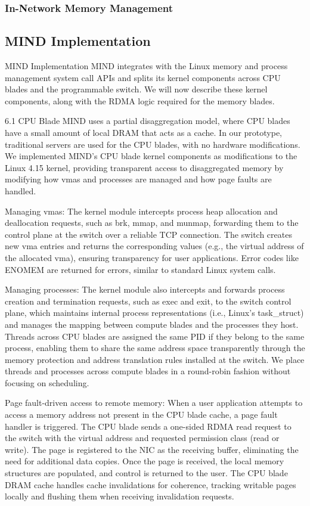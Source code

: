 \subsubsection{In-Network Memory Management}

\subsection{MIND Implementation}
MIND Implementation
MIND integrates with the Linux memory and process management system call APIs and splits its kernel components across CPU blades and the programmable switch. We will now describe these kernel components, along with the RDMA logic required for the memory blades.

6.1 CPU Blade
MIND uses a partial disaggregation model, where CPU blades have a small amount of local DRAM that acts as a cache. In our prototype, traditional servers are used for the CPU blades, with no hardware modifications. We implemented MIND’s CPU blade kernel components as modifications to the Linux 4.15 kernel, providing transparent access to disaggregated memory by modifying how vmas and processes are managed and how page faults are handled.

Managing vmas: The kernel module intercepts process heap allocation and deallocation requests, such as brk, mmap, and munmap, forwarding them to the control plane at the switch over a reliable TCP connection. The switch creates new vma entries and returns the corresponding values (e.g., the virtual address of the allocated vma), ensuring transparency for user applications. Error codes like ENOMEM are returned for errors, similar to standard Linux system calls.

Managing processes: The kernel module also intercepts and forwards process creation and termination requests, such as exec and exit, to the switch control plane, which maintains internal process representations (i.e., Linux’s task\_struct) and manages the mapping between compute blades and the processes they host. Threads across CPU blades are assigned the same PID if they belong to the same process, enabling them to share the same address space transparently through the memory protection and address translation rules installed at the switch. We place threads and processes across compute blades in a round-robin fashion without focusing on scheduling.

Page fault-driven access to remote memory: When a user application attempts to access a memory address not present in the CPU blade cache, a page fault handler is triggered. The CPU blade sends a one-sided RDMA read request to the switch with the virtual address and requested permission class (read or write). The page is registered to the NIC as the receiving buffer, eliminating the need for additional data copies. Once the page is received, the local memory structures are populated, and control is returned to the user. The CPU blade DRAM cache handles cache invalidations for coherence, tracking writable pages locally and flushing them when receiving invalidation requests.

